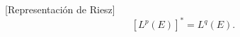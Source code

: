\begin{teorema}{}[Representaci\'on de Riesz]
\[
[L^p(E)]^*=L^q(E).\]
\end{teorema}
% 
% 
% 
% 
% 
% 
